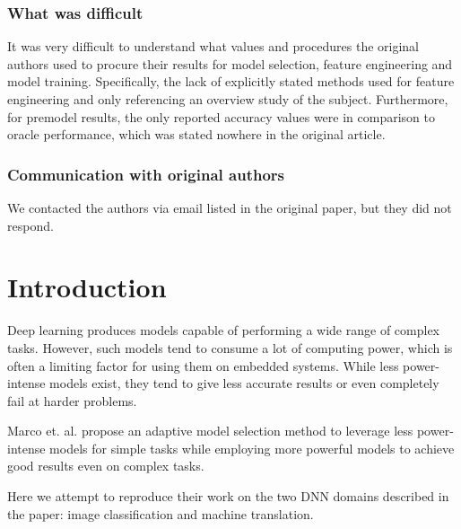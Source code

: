 \subsubsection{What was difficult}
It was very difficult to understand what values and procedures the original authors used to procure their results for model selection, feature engineering and model training. Specifically, the lack of explicitly stated methods used for feature engineering and only referencing an overview study of the subject. Furthermore, for premodel results, the only reported accuracy values were in comparison to oracle performance, which was stated nowhere in the original article. 

\subsubsection{Communication with original authors}

We contacted the authors via email listed in the original paper, but they did not respond.



\section{Introduction}
Deep learning produces models capable of performing a wide range of complex tasks. However, such models tend to consume a lot of computing power, which is often a limiting factor for using them on embedded systems. While less power-intense models exist, they tend to give less accurate results or even completely fail at harder problems.

Marco et. al. \cite{marco2019optimizing} propose an adaptive model selection method to leverage less power-intense models for simple tasks while employing more powerful models to achieve good results even on complex tasks.

Here we attempt to reproduce their work on the two DNN domains described in the paper: image classification and machine translation.

